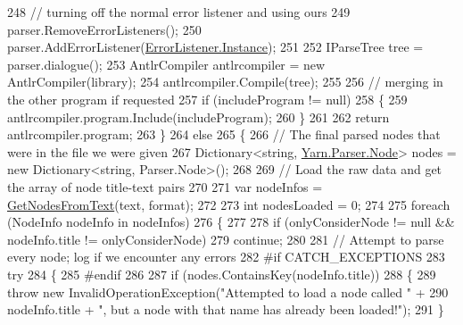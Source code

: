 \begin{DoxyCode}
248                 \textcolor{comment}{// turning off the normal error listener and using ours}
249                 parser.RemoveErrorListeners();
250                 parser.AddErrorListener(\hyperlink{a00102_a47b8f4f1d414afa1ea6067218c7ee34d}{ErrorListener.Instance});
251 
252                 IParseTree tree = parser.dialogue();
253                 AntlrCompiler antlrcompiler = \textcolor{keyword}{new} AntlrCompiler(library);
254                 antlrcompiler.Compile(tree);
255 
256                 \textcolor{comment}{// merging in the other program if requested}
257                 \textcolor{keywordflow}{if} (includeProgram != null)
258                 \{
259                     antlrcompiler.program.Include(includeProgram);
260                 \}
261 
262                 \textcolor{keywordflow}{return} antlrcompiler.program;
263             \}
264             \textcolor{keywordflow}{else}
265             \{
266                 \textcolor{comment}{// The final parsed nodes that were in the file we were given}
267                 Dictionary<string, \hyperlink{a00140}{Yarn.Parser.Node}> nodes = \textcolor{keyword}{new} Dictionary<string, 
      Parser.Node>();
268 
269                 \textcolor{comment}{// Load the raw data and get the array of node title-text pairs}
270 
271                 var nodeInfos = \hyperlink{a00135_a0aa76ba9366b44bf78198a78ea958c9c}{GetNodesFromText}(text, format);
272 
273                 \textcolor{keywordtype}{int} nodesLoaded = 0;
274 
275                 \textcolor{keywordflow}{foreach} (NodeInfo nodeInfo \textcolor{keywordflow}{in} nodeInfos)
276                 \{
277 
278                     \textcolor{keywordflow}{if} (onlyConsiderNode != null && nodeInfo.title != onlyConsiderNode)
279                         \textcolor{keywordflow}{continue};
280 
281                     \textcolor{comment}{// Attempt to parse every node; log if we encounter any errors}
282 \textcolor{preprocessor}{#if CATCH\_EXCEPTIONS}
283 \textcolor{preprocessor}{}                    \textcolor{keywordflow}{try}
284                     \{
285 \textcolor{preprocessor}{#endif}
286 \textcolor{preprocessor}{}
287                         \textcolor{keywordflow}{if} (nodes.ContainsKey(nodeInfo.title))
288                         \{
289                             \textcolor{keywordflow}{throw} \textcolor{keyword}{new} InvalidOperationException(\textcolor{stringliteral}{"Attempted to load a node called "} +
290                                 nodeInfo.title + \textcolor{stringliteral}{", but a node with that name has already been loaded!"});
291                         \}

\end{DoxyCode}

